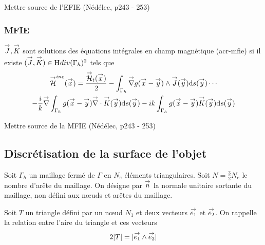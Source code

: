         \begin{REF}
          Mettre source de l'EFIE (Nédélec, p243 - 253)
        \end{REF}

      \subsubsection{MFIE}

        \begin{defn}
          \({\overset{\rightarrow}{J}},{\overset{\rightarrow}{K}}\) sont solutions des équations intégrales en champ magnétique (\gls{acr-mfie}) si il existe \(({\overset{\rightarrow}{J}},{\overset{\rightarrow}{K}}) \in \mathrm{H}_\mathrm{{}}{div}(\Gamma_h)^2\) tels que
          \begin{multline}
            \label{eq:form_int:MFIE}
            \vH^{inc}(\vx) =
            \frac{\vH_t(\vx)}{2}
              - \int_{\Gamma_h} \vgrad g(\vx - \vy) \pvect \vJ(\vy) \dd{s}(\vy) \cdots \\
            - \frac{i}{k} \vgrad \int_{\Gamma_h}  g(\vx - \vy)\vdiv\vK(\vy)\dd{s}(\vy)
              - ik \int_{\Gamma_h} g(\vx - \vy)\vK(\vy)\dd{s}(\vy)
          \end{multline}
        \end{defn}

        \begin{REF}
          Mettre source de la MFIE (Nédélec, p243 - 253)
        \end{REF}

  \subsection{Discrétisation de la surface de l'objet}

    Soit \(\Gamma_h\) un maillage fermé de \(\Gamma\) en \(N_e\) éléments triangulaires. Soit \(N=\frac{3}{2}N_e\) le nombre d'arête du maillage. On désigne par \({\overset{\rightarrow}{n}}\) la normale unitaire sortante du maillage, non défini aux nœuds et arêtes du maillage.

    Soit \(T\) un triangle défini par un nœud \(N_1\) et deux vecteurs \({\overset{\rightarrow}{e_1}}\) et \({\overset{\rightarrow}{e_2}}\). On rappelle la relation entre l'aire du triangle et ces vecteurs
    \begin{equation}
      2|T| = |{\overset{\rightarrow}{e_1}}\wedge{\overset{\rightarrow}{e_2}}|
    \end{equation}

